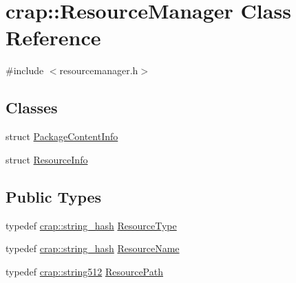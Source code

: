 \hypertarget{classcrap_1_1_resource_manager}{\section{crap\+:\+:Resource\+Manager Class Reference}
\label{classcrap_1_1_resource_manager}
}


{\ttfamily \#include $<$resourcemanager.\+h$>$}

\subsection*{Classes}
\begin{DoxyCompactItemize}
\item 
struct \hyperlink{structcrap_1_1_resource_manager_1_1_package_content_info}{Package\+Content\+Info}
\item 
struct \hyperlink{structcrap_1_1_resource_manager_1_1_resource_info}{Resource\+Info}
\end{DoxyCompactItemize}
\subsection*{Public Types}
\begin{DoxyCompactItemize}
\item 
typedef \hyperlink{classcrap_1_1string__hash}{crap\+::string\+\_\+hash} \hyperlink{classcrap_1_1_resource_manager_a68532afc0951e49f936b71bbf9bdf804}{Resource\+Type}
\item 
typedef \hyperlink{classcrap_1_1string__hash}{crap\+::string\+\_\+hash} \hyperlink{classcrap_1_1_resource_manager_a1aa9ba8213544040ec264aa4b1651f78}{Resource\+Name}
\item 
typedef \hyperlink{namespacecrap_a52392ad28972b8b96725b2f7928d38fa}{crap\+::string512} \hyperlink{classcrap_1_1_resource_manager_a65958e1fcdda3a97f5ef9e006e30fad8}{Resource\+Path}
\end{DoxyCompactItemize}
